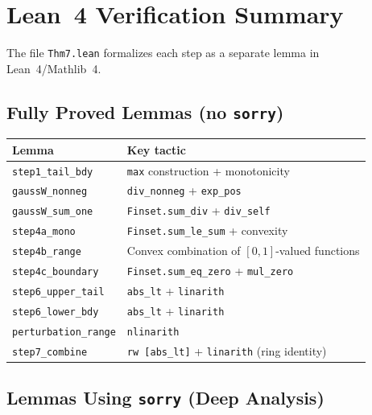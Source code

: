 \documentclass[12pt]{article}
\theoremstyle{remark}
\begin{document}
\section{Lean~4 Verification Summary}

The file \texttt{Thm7.lean} formalizes each step as a separate lemma in Lean~4/Mathlib~4.

\subsection*{Fully Proved Lemmas (no \texttt{sorry})}

\begin{center}
\begin{tabular}{ll}
\hline
\textbf{Lemma} & \textbf{Key tactic} \\
\hline
\texttt{step1\_tail\_bdy} & \texttt{max} construction + monotonicity \\
\texttt{gaussW\_nonneg} & \texttt{div\_nonneg} + \texttt{exp\_pos} \\
\texttt{gaussW\_sum\_one} & \texttt{Finset.sum\_div} + \texttt{div\_self} \\
\texttt{step4a\_mono} & \texttt{Finset.sum\_le\_sum} + convexity \\
\texttt{step4b\_range} & Convex combination of $[0,1]$-valued functions \\
\texttt{step4c\_boundary} & \texttt{Finset.sum\_eq\_zero} + \texttt{mul\_zero} \\
\texttt{step6\_upper\_tail} & \texttt{abs\_lt} + \texttt{linarith} \\
\texttt{step6\_lower\_bdy} & \texttt{abs\_lt} + \texttt{linarith} \\
\texttt{perturbation\_range} & \texttt{nlinarith} \\
\texttt{step7\_combine} & \texttt{rw [abs\_lt]} + \texttt{linarith} (ring identity) \\
\hline
\end{tabular}
\end{center}

\subsection*{Lemmas Using \texttt{sorry} (Deep Analysis)}
\end{document}
